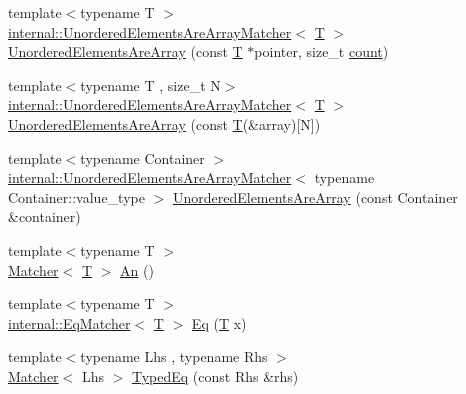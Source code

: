 \begin{DoxyCompactItemize}
\item 
{\footnotesize template$<$typename T $>$ }\\\hyperlink{classtesting_1_1internal_1_1_unordered_elements_are_array_matcher}{internal\+::\+Unordered\+Elements\+Are\+Array\+Matcher}$<$ \hyperlink{functions__7_8js_adf1f3edb9115acb0a1e04209b7a9937b}{T} $>$ \hyperlink{namespacetesting_a99b9509a7cd405be28bf45231577384b}{Unordered\+Elements\+Are\+Array} (const \hyperlink{functions__7_8js_adf1f3edb9115acb0a1e04209b7a9937b}{T} $\ast$pointer, size\+\_\+t \hyperlink{gmock__stress__test_8cc_afd9db40e3361ae09188795e8cbe19752}{count})
\item 
{\footnotesize template$<$typename T , size\+\_\+t N$>$ }\\\hyperlink{classtesting_1_1internal_1_1_unordered_elements_are_array_matcher}{internal\+::\+Unordered\+Elements\+Are\+Array\+Matcher}$<$ \hyperlink{functions__7_8js_adf1f3edb9115acb0a1e04209b7a9937b}{T} $>$ \hyperlink{namespacetesting_a23c7729cfc61967f3271018076c4b724}{Unordered\+Elements\+Are\+Array} (const \hyperlink{functions__7_8js_adf1f3edb9115acb0a1e04209b7a9937b}{T}(\&array)\mbox{[}N\mbox{]})
\item 
{\footnotesize template$<$typename Container $>$ }\\\hyperlink{classtesting_1_1internal_1_1_unordered_elements_are_array_matcher}{internal\+::\+Unordered\+Elements\+Are\+Array\+Matcher}$<$ typename Container\+::value\+\_\+type $>$ \hyperlink{namespacetesting_a72b0ee2217293106fcf4971dc4a59f4c}{Unordered\+Elements\+Are\+Array} (const Container \&container)
\item 
{\footnotesize template$<$typename T $>$ }\\\hyperlink{classtesting_1_1_matcher}{Matcher}$<$ \hyperlink{functions__7_8js_adf1f3edb9115acb0a1e04209b7a9937b}{T} $>$ \hyperlink{namespacetesting_a48792471ff9cdf5b4f95a4242df7bfbb}{An} ()
\item 
{\footnotesize template$<$typename T $>$ }\\\hyperlink{classtesting_1_1internal_1_1_eq_matcher}{internal\+::\+Eq\+Matcher}$<$ \hyperlink{functions__7_8js_adf1f3edb9115acb0a1e04209b7a9937b}{T} $>$ \hyperlink{namespacetesting_a0cb8ba7eae844c871eccb29e7c81635f}{Eq} (\hyperlink{functions__7_8js_adf1f3edb9115acb0a1e04209b7a9937b}{T} x)
\item 
{\footnotesize template$<$typename Lhs , typename Rhs $>$ }\\\hyperlink{classtesting_1_1_matcher}{Matcher}$<$ Lhs $>$ \hyperlink{namespacetesting_a57c9aba17aaa27d818e80a1eec81070f}{Typed\+Eq} (const Rhs \&rhs)

\end{DoxyCompactItemize}
